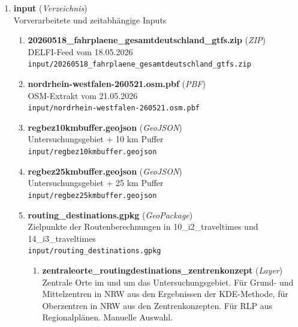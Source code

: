 

\begin{enumerate}[label=\arabic*., leftmargin=*, itemsep=0.5em, topsep=0.3em]
\item \textbf{input} \textnormal{(\textit{Verzeichnis})}\\
Vorverarbeitete und zeitabhängige Inputs
\begin{enumerate}[label=\arabic{enumi}.\arabic*, leftmargin=*, itemsep=0.5em, topsep=0.3em]
\item \textbf{20260518\_fahrplaene\_gesamtdeutschland\_gtfs.zip} \textnormal{(\textit{ZIP})}\\
DELFI-Feed vom 18.05.2026\\
\texttt{\small input/20260518\_fahrplaene\_gesamtdeutschland\_gtfs.zip}
\item \textbf{nordrhein-westfalen-260521.osm.pbf} \textnormal{(\textit{PBF})}\\
OSM-Extrakt vom 21.05.2026\\
\texttt{\small input/nordrhein-westfalen-260521.osm.pbf}
\item \textbf{regbez10kmbuffer.geojson} \textnormal{(\textit{GeoJSON})}\\
Untersuchungsgebiet + 10 km Puffer\\
\texttt{\small input/regbez10kmbuffer.geojson}
\item \textbf{regbez25kmbuffer.geojson} \textnormal{(\textit{GeoJSON})}\\
Untersuchungsgebiet + 25 km Puffer\\
\texttt{\small input/regbez25kmbuffer.geojson}
\item \textbf{routing\_destinations.gpkg} \textnormal{(\textit{GeoPackage})}\\
Zielpunkte der Routenberechnungen in 10\_i2\_traveltimes und 14\_i3\_traveltimes\\
\texttt{\small input/routing\_destinations.gpkg}
\begin{enumerate}[label=\arabic{enumi}.\arabic{enumii}.\arabic*, leftmargin=*, itemsep=0.5em, topsep=0.3em]
\item \textbf{zentraleorte\_routingdestinations\_zentrenkonzept} \textnormal{(\textit{Layer})}\\
Zentrale Orte im und um das Untersuchungsgebiet. Für Grund- und Mittelzentren in NRW aus den Ergebnissen der KDE-Methode, für Oberzentren in NRW aus den Zentrenkonzepten. Für RLP aus Regionalplänen. Manuelle Auswahl.

\end{enumerate}
\end{enumerate}
\end{enumerate}
